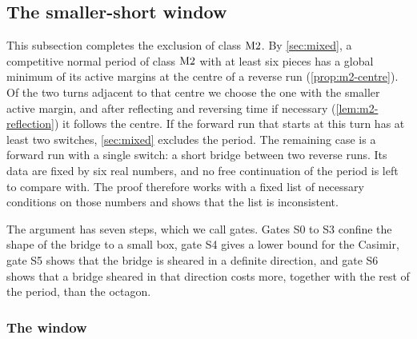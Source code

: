 \subsection{The smaller-short window}\label{sec:smaller-short}

This subsection completes the exclusion of class $\mathrm{M2}$. By \cref{sec:mixed}, a competitive
normal period of class $\mathrm{M2}$ with at least six pieces has a global minimum of its active
margins at the centre of a reverse run (\cref{prop:m2-centre}). Of the two turns adjacent to that
centre we choose the one with the smaller active margin, and after reflecting and reversing time
if necessary (\cref{lem:m2-reflection}) it follows the centre. If the forward run that starts at
this turn has at least two switches, \cref{sec:mixed} excludes the period. The remaining case is a
forward run with a single switch: a short bridge between two reverse runs. Its data are fixed by
six real numbers, and no free continuation of the period is left to compare with. The proof
therefore works with a fixed list of necessary conditions on those numbers and shows that the list
is inconsistent.

The argument has seven steps, which we call gates. Gates S0 to S3 confine the shape of
the bridge to a small box, gate S4 gives a lower bound for the Casimir, gate S5 shows that the
bridge is sheared in a definite direction, and gate S6 shows that a bridge sheared in that
direction costs more, together with the rest of the period, than the octagon.

\subsubsection{The window}\label{sec:ss-window}

